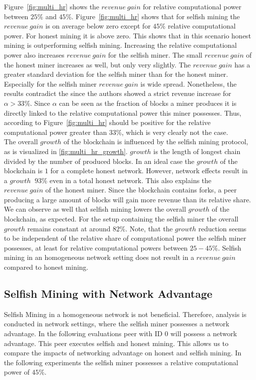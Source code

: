Figure~\ref{fig:multi_hr} shows the $revenue~gain$ for relative computational power between $25\% $ and $45\% $. Figure~\ref{fig:multi_hr} shows that for selfish mining the $revenue~gain$ is on average below zero except for $45\% $ relative computational power. For honest mining it is above zero. This shows that in this scenario honest mining is outperforming selfish mining. Increasing the relative computational power also increases $revenue~gain$ for the selfish miner. The small $revenue~gain$ of the honest miner increases as well, but only very slightly. The $revenue~gain$ has a greater standard deviation for the selfish miner than for the honest miner. Especially for the selfish miner $revenue~gain$ is wide spread. Nonetheless, the results contradict the  since the authors showed a strict revenue increase for $\alpha > 33\% $. Since $\alpha$ can be seen as the fraction of blocks a miner produces it is directly linked to the relative computational power this miner possesses. Thus, according to  Figure~\ref{fig:multi_hr} should be positive for the relative computational power greater than $33\% $, which is very clearly not the case.\\
The overall $growth$ of the blockchain is influenced by the selfish mining protocol, as is visualized in \ref{fig:multi_hr_growth}. $growth$ is the length of longest chain divided by the number of produced blocks. In an ideal case the $growth$ of the blockchain is $1$ for a complete honest network. However, network effects result in a $growth$ $~93\% $ even in a total honest network. This also explains the $revenue~gain$ of the honest miner. Since the blockchain contains forks, a peer producing a large amount of blocks will gain more revenue than its relative share. We can observe as well that selfish mining lowers the overall $growth$ of the blockchain, as expected. For the setup containing the selfish miner the overall $growth$ remains constant at around $82\% $. Note, that the $growth$ reduction seems to be independent of the relative share of computational power the selfish miner possesses, at least for relative computational powers between $25-45\% $.
Selfish mining in an homogeneous network setting does not result in a $revenue~gain$ compared to honest mining.

\subsection{Selfish Mining with Network Advantage}
Selfish Mining in a homogeneous network is not beneficial. Therefore, analysis is conducted in network settings, where the selfish miner possesses a network advantage. In the following evaluations peer with ID $0$ will possess a network advantage. This peer executes selfish and honest mining. This allows us to compare the impacts of networking advantage on honest and selfish mining. In the following experiments the selfish miner possesses a relative computational power of $45\% $.

